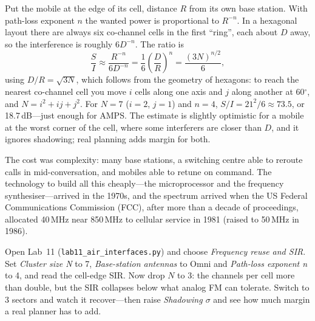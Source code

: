 
\begin{deeper}
Put the mobile at the edge of its cell, distance $R$ from its own base station. With path-loss
exponent $n$ the wanted power is proportional to $R^{-n}$. In a hexagonal layout there are always
six co-channel cells in the first ``ring'', each about $D$ away, so the interference is roughly
$6D^{-n}$. The ratio is
\[
\frac{S}{I}\approx\frac{R^{-n}}{6D^{-n}}=\frac{1}{6}\left(\frac{D}{R}\right)^{n}=\frac{(3N)^{n/2}}{6},
\]
using $D/R=\sqrt{3N}$, which follows from the geometry of hexagons: to reach the nearest co-channel
cell you move $i$ cells along one axis and $j$ along another at 60$^\circ$, and $N=i^2+ij+j^2$. For
$N=7$ ($i=2$, $j=1$) and $n=4$, $S/I=21^2/6\approx73.5$, or 18.7\,dB---just enough for AMPS. The
estimate is slightly optimistic for a mobile at the worst corner of the cell, where some
interferers are closer than $D$, and it ignores shadowing; real planning adds margin for both.
\end{deeper}

The cost was complexity: many base stations, a switching centre able to reroute calls in
mid-conversation, and mobiles able to retune on command. The technology to build all this
cheaply---the microprocessor and the frequency synthesiser---arrived in the 1970s, and the spectrum
arrived when the US Federal Communications Commission (FCC), after more than a decade of
proceedings, allocated 40\,MHz near 850\,MHz to cellular service in 1981 (raised to 50\,MHz in
1986).


\begin{tryit}
Open Lab~11 (\texttt{lab11\_air\_interfaces.py}) and choose \emph{Frequency reuse and SIR}. Set
\emph{Cluster size N} to 7, \emph{Base-station antennas} to Omni and \emph{Path-loss exponent n} to
4, and read the cell-edge SIR. Now drop $N$ to 3: the channels per cell more than double, but the
SIR collapses below what analog FM can tolerate. Switch to 3 sectors and watch it recover---then
raise \emph{Shadowing $\sigma$} and see how much margin a real planner has to add.
\end{tryit}

